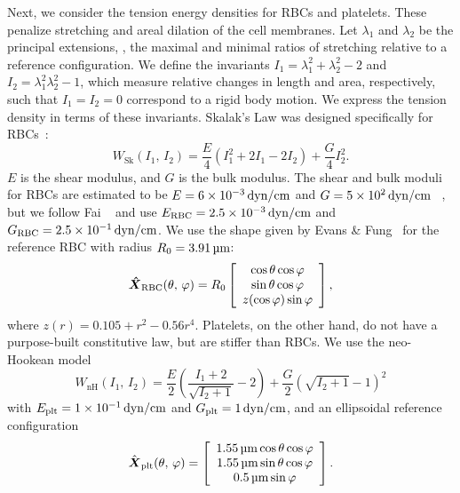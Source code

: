 Next, we consider the tension energy densities for RBCs and platelets. These penalize
stretching and areal dilation of the cell membranes. Let $\lambda_1$ and $\lambda_2$ be
the principal extensions, , the maximal and minimal ratios of stretching
relative to a reference configuration. We define the invariants $I_1=\lambda_1^2+\lambda_2^2-2$
and $I_2 = \lambda_1^2\lambda_2^2-1$, which measure relative changes in length and area,
respectively, such that $I_1 = I_2 = 0$ correspond to a rigid body motion. We express the
tension density in terms of these invariants. Skalak's Law was designed specifically for
RBCs~\cite{Skalak:1973tp}:
\begin{equation}\label{eq:skalak-law}
    W_\text{Sk}(I_1,\,I_2) = \frac{E}4\left(I_1^2 + 2I_1 - 2I_2\right) + \frac{G}4 I_2^2.
\end{equation}
$E$ is the shear modulus, and $G$ is the bulk modulus. The shear and bulk moduli for RBCs
are estimated to be $E = 6\sci{-3}\dynpercm$ and $G = 5\sci2\dynpercm$~%
\cite{Mohandas:1994tg}, but we follow Fai ~\cite{Fai:2013do} and use
$\rbc{E} = 2.5\sci{-3}\dynpercm$ and $\rbc{G} = 2.5\sci{-1}\dynpercm$. We use
the shape given by Evans \& Fung~\cite{Evans:1972uf} for the reference RBC with radius
$R_0 = 3.91\um$:
\begin{equation*}
    {\boldsymbol{\hat{X}}}_\text{RBC}(\theta,\,\varphi) = R_0\left[\begin{array}{c}
            \cos\theta\cos\varphi \\
            \sin\theta\cos\varphi \\
            z(\cos\varphi)\sin\varphi
    \end{array}\right],
\end{equation*}
where $z(r) = 0.105 + r^2 - 0.56r^4$. Platelets, on the other hand, do not have a
purpose-built constitutive law, but are stiffer than RBCs. We use the neo-Hookean model
\begin{equation}\label{eq:neohookean}
    W_\text{nH}(I_1,\,I_2) = \frac{E}2\left(\frac{I_1+2}{\sqrt{I_2+1}}-2\right) + \frac{G}2 {\left(\sqrt{I_2+1}-1\right)}^2
\end{equation}
with $\plt{E} = 1\sci{-1}\dynpercm$ and $\plt{G} = 1\dynpercm$, and an ellipsoidal
reference configuration~\cite{Frojmovic:1982wk}
\begin{equation*}
    \plt{\hat{\vec{X}}}(\theta,\,\varphi) = \left[\begin{array}{c}
            1.55\um\cos\theta\cos\varphi \\
            1.55\um\sin\theta\cos\varphi \\
            0.5\um\sin\varphi
    \end{array}\right].
\end{equation*}


